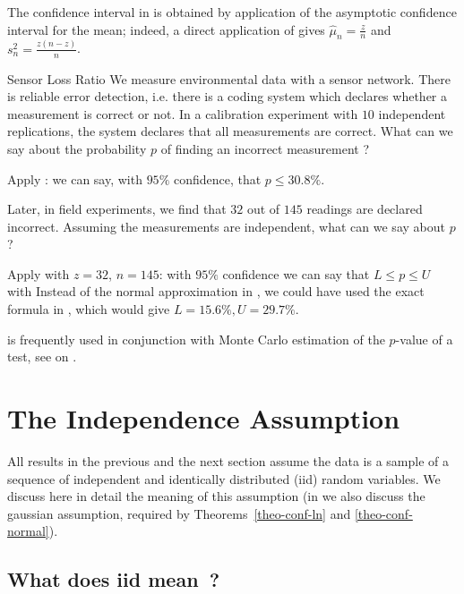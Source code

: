 The confidence interval in  is obtained
by application of the asymptotic confidence interval for the
mean; indeed, a direct application of 
gives $\hat{\mu}_n=\frac{z}{n}$ and $s^2_n=\frac{z (n-z)}{n}$.

\begin{exnn}{Sensor Loss Ratio}
We measure environmental data with a sensor network. There is
reliable error detection, i.e. there is a coding system which
declares whether a measurement is correct or not. In a
calibration experiment with $10$ independent replications, the
system declares that all measurements are correct. What can we
say about the probability $p$ of finding an incorrect
measurement ?

Apply : we can say, with $95\%$ confidence,
that $p\leq 30.8\%$.

Later, in field experiments, we find that $32$ out of $145$
readings are declared incorrect. Assuming the measurements are
independent, what can we say about $p$ ?

Apply  with $z=32$, $n=145$: with
$95\%$ confidence we can say that $L \leq p \leq U$ with
 \ben
 \een
Instead of the normal approximation in
, we could have used the exact formula
in , which would give $L=  15.6\%, U= 29.7\%$.
\end{exnn}

 is frequently used in conjunction with
Monte Carlo estimation of the $p$-value of a test, see
 on .
%
%
\section{The Independence Assumption}
All results in the previous and the next
section assume the data is a sample of a sequence of
independent and identically distributed (iid) random variables.
We discuss here in detail the meaning of this assumption (in
 we also discuss the gaussian
assumption, required by Theorems~\ref{theo-conf-ln} and
\ref{theo-conf-normal}).

\subsection{What does iid mean~?}

